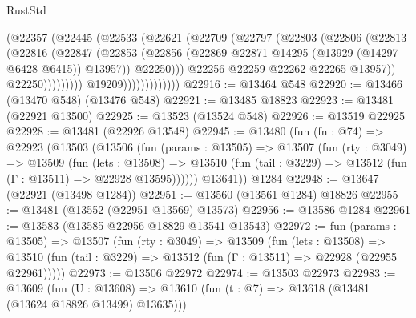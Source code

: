 \begin{lexlean}{RustStd}
\begin{coremodule}
                                  (@22357
                                    (@22445
                                      (@22533
                                        (@22621
                                          (@22709
                                            (@22797
                                              (@22803
                                                (@22806
                                                  (@22813
                                                    (@22816
                                                      (@22847
                                                        (@22853
                                                          (@22856
                                                            (@22869
                                                              @22871
                                                              @14295
                                                              (@13929 (@14297 @6428 @6415))
                                                              @13957))
                                                          @22250)))
                                                    @22256
                                                    @22259
                                                    @22262
                                                    @22265
                                                    @13957))
                                                @22250)))))))))
                              @19209)))))))))))))
@22916 := @13464 @548
@22920 := @13466 (@13470 @548) (@13476 @548)
@22921 := @13485 @18823
@22923 := @13481 (@22921 @13500)
@22925 := @13523 (@13524 @548)
@22926 := @13519 @22925
@22928 := @13481 (@22926 @13548)
@22945 := @13480
    (fun (fn : @74) =>
    @22923
      (@13503
        (@13506
          (fun (params : @13505) =>
          @13507
            (fun (rty : @3049) =>
            @13509
              (fun (lets : @13508) =>
              @13510 (fun (tail : @3229) => @13512 (fun (Γ : @13511) => @22928 @13595))))))
        @13641))
    @1284
@22948 := @13647 (@22921 (@13498 @1284))
@22951 := @13560 (@13561 @1284) @18826
@22955 := @13481 (@13552 (@22951 @13569) @13573)
@22956 := @13586 @1284
@22961 := @13583 (@13585 @22956 @18829 @13541 @13543)
@22972 := fun (params : @13505) =>
  @13507
    (fun (rty : @3049) =>
    @13509
      (fun (lets : @13508) =>
      @13510 (fun (tail : @3229) => @13512 (fun (Γ : @13511) => @22928 (@22955 @22961)))))
@22973 := @13506 @22972
@22974 := @13503 @22973
@22983 := @13609
    (fun (U : @13608) => @13610 (fun (t : @7) => @13618 (@13481 (@13624 @18826 @13499) @13635)))

\end{coremodule}
\end{lexlean}
